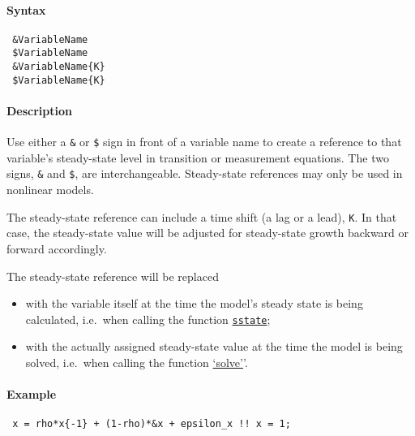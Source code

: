 


	\paragraph{Syntax}
 
 \begin{verbatim}
 &VariableName
 $VariableName
 &VariableName{K}
 $VariableName{K}
 \end{verbatim}
 
 \paragraph{Description}
 
 Use either a \texttt{\&} or \texttt{\$} sign in front of a variable name
 to create a reference to that variable's steady-state level in
 transition or measurement equations. The two signs, \texttt{\&} and
 \texttt{\$}, are interchangeable. Steady-state references may only be
 used in nonlinear models.
 
 The steady-state reference can include a time shift (a lag or a lead),
 \texttt{K}. In that case, the steady-state value will be adjusted for
 steady-state growth backward or forward accordingly.
 
 The steady-state reference will be replaced
 
 \begin{itemize}
 \item
   with the variable itself at the time the model's steady state is being
   calculated, i.e.~when calling the function
   \href{model/sstate}{\texttt{sstate}};
 \item
   with the actually assigned steady-state value at the time the model is
   being solved, i.e.~when calling the function
   \href{model/solve}{`solve'}'.
 \end{itemize}
 
 \paragraph{Example}
 
 \begin{verbatim}
 x = rho*x{-1} + (1-rho)*&x + epsilon_x !! x = 1;
 \end{verbatim}


